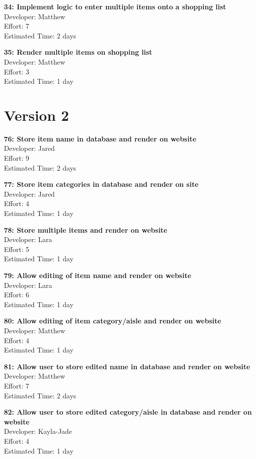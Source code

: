 \documentclass[10pt,onecolumn]{witseiepaper}
\begin{document}
\textbf{34: Implement logic to enter multiple items onto a shopping list} \\
Developer: Matthew\\
Effort: 7\\
Estimated Time: 2 days


\textbf{35: Render multiple items on shopping list} \\
Developer: Matthew\\
Effort: 3\\
Estimated Time: 1 day

\section*{Version 2}

\textbf{76: Store item name in database and render on website} \\
Developer: Jared\\
Effort: 9\\
Estimated Time: 2 days

\textbf{77: Store item categories in database and render on site} \\
Developer: Jared\\
Effort: 4\\
Estimated Time: 1 day

\textbf{78: Store multiple items and render on website} \\
Developer: Lara\\
Effort: 5\\
Estimated Time: 1 day

\textbf{79: Allow editing of item name and render on website} \\
Developer: Lara\\
Effort: 6\\
Estimated Time: 1 day

\textbf{80: Allow editing of item category/aisle and render on website} \\
Developer: Matthew\\
Effort: 4\\
Estimated Time: 1 day

\textbf{81: Allow user to store edited name in database and render on website} \\
Developer: Matthew\\
Effort: 7\\
Estimated Time: 2 days

\textbf{82: Allow user to store edited category/aisle in database and render on website} \\
Developer: Kayla-Jade\\
Effort: 4\\
Estimated Time: 1 day
\end{document}
